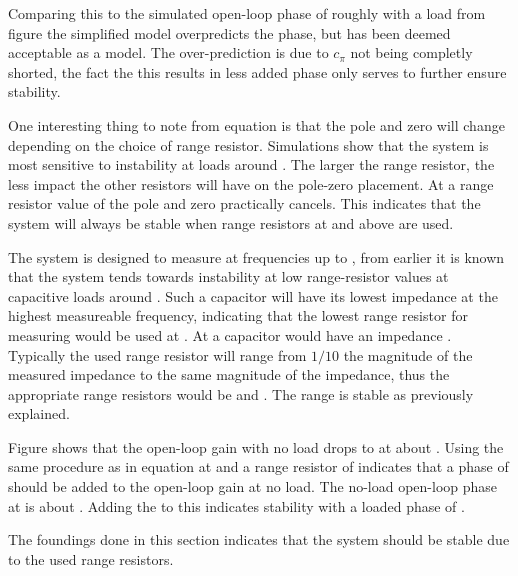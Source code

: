 Comparing this to the simulated open-loop phase of roughly  with a  load from figure  the simplified model overpredicts the phase, but has been deemed acceptable as a model. The over-prediction is due to $c_\pi$ not being completly shorted, the fact the this results in less added phase only serves to further ensure stability.

One interesting thing to note from equation  is that the pole and zero will change depending on the choice of range resistor. Simulations show that the system is most sensitive to instability at loads around . The larger the range resistor, the less impact the other resistors will have on the pole-zero placement. At a range resistor value of  the pole and zero practically cancels. This indicates that the system will always be stable when range resistors at and above  are used. 

The system is designed to measure at frequencies up to , from earlier it is known that the system tends towards instability at low range-resistor values at capacitive loads around . Such a capacitor will have its lowest impedance at the highest measureable frequency, indicating that the lowest range resistor for measuring  would be used at . At  a  capacitor would have an impedance . Typically the used range resistor will range from $1/10$ the magnitude of the measured impedance to the same magnitude of the impedance, thus the appropriate range resistors would be  and . The  range is stable as previously explained. 

Figure  shows that the open-loop gain with no load drops to  at about . Using the same procedure as in equation  at  and a range resistor of  indicates that a phase of  should be added to the open-loop gain at no load. The no-load open-loop phase at  is about . Adding the  to this indicates stability with a loaded phase of .

The foundings done in this section indicates that the system should be stable due to the used range resistors.


